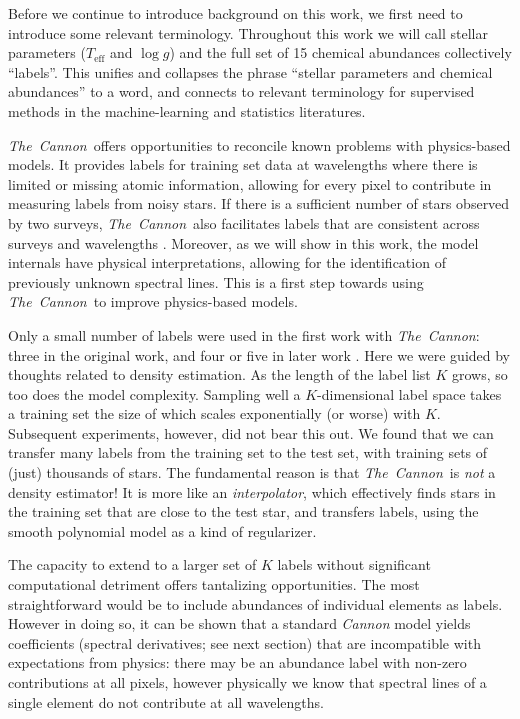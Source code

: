 \documentclass[12pt,preprint]{aastex}
\newcommand{\project}[1]{\textsl{#1}}
\newcommand{\TheCannon}{\project{The~Cannon}}
\newcommand{\logg}{\log g}
\newcommand{\Teff}{T_{\mathrm{eff}}}
\begin{document}


Before we continue to introduce background on this work, we first need to
introduce some relevant terminology.  Throughout this work we will call stellar 
parameters ($\Teff$ and $\logg$) and the full set of 15 chemical abundances 
collectively ``labels''.  This unifies and collapses the phrase ``stellar
parameters and chemical abundances'' to a word, and connects to relevant 
terminology for supervised methods in the machine-learning and statistics 
literatures.  


\TheCannon\ offers opportunities to reconcile known problems with physics-based 
models.  It provides labels for training set data at wavelengths where there is
limited or missing atomic information, allowing for every pixel to contribute in 
measuring labels from noisy stars.  If there is a sufficient
number of stars observed by two surveys, \TheCannon\ also facilitates labels that
are consistent across surveys and wavelengths \citep{Ho_2016}.  Moreover, as we
will show in this work, the model internals have physical interpretations, 
allowing for the identification of previously unknown spectral lines.  This is
a first step towards using \TheCannon\ to improve physics-based models.


Only a small number of labels were used in the first work with \TheCannon: 
three in the original work, and four or five in later work \citep{tc, age}. 
Here we were guided by thoughts related to density estimation. As the length of 
the label list $K$ grows, so too does the model complexity.  Sampling well a 
$K$-dimensional label space takes a training set the size of which scales 
exponentially (or worse) with $K$.  Subsequent experiments, however, did not 
bear this out.  We found that we can transfer many labels from the training set 
to the test set, with training sets of (just) thousands of stars.  The fundamental 
reason is that \TheCannon\ is \emph{not} a density estimator!  It is more like 
an \emph{interpolator}, which effectively finds stars in the training set that
are close to the test star, and transfers labels, using the smooth polynomial 
model as a kind of regularizer.




The capacity to extend to a larger set of $K$ labels without significant
computational detriment offers tantalizing opportunities.  The most 
straightforward would be to include abundances of individual elements as labels.
However in doing so, it can be shown that a standard \emph{Cannon} model yields
coefficients (spectral derivatives; see next section) that are incompatible with 
expectations from physics: there may be an abundance label with non-zero 
contributions at all pixels, however physically we know that spectral lines of a
single element do not contribute at all wavelengths. 
\end{document}

